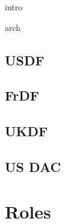  {intro}

 {arch}






\subsection{USDF}
\subsection{FrDF}
\subsection{UKDF}
\subsection{US DAC}


\section{Roles}
